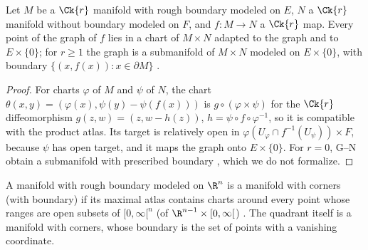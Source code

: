 \begin{proposition}[Graphs]
  \label{prop:rough-graph}
  \leanok
  Let $M$ be a $\Ck{r}$ manifold with rough boundary modeled on $E$, $N$ a $\Ck{r}$ manifold without
  boundary modeled on $F$, and $f \colon M \to N$ a $\Ck{r}$ map. Every point of the graph of $f$
  lies in a chart of $M \times N$ adapted to the graph and to $E \times \{0\}$; for $r \geq 1$ the
  graph is a submanifold of $M \times N$ modeled on $E \times \{0\}$, with boundary
  $\{(x, f(x)) : x \in \partial M\}$ \cite[Proposition 3.5.17, pp.~283--284]{GN26}.
\end{proposition}

\begin{proof}
  \leanok
  For charts $\varphi$ of $M$ and $\psi$ of $N$, the chart
  $\theta(x, y) = (\varphi(x), \psi(y) - \psi(f(x)))$ is $g \circ (\varphi \times \psi)$ for the
  $\Ck{r}$ diffeomorphism $g(z, w) = (z, w - h(z))$, $h = \psi \circ f \circ \varphi^{-1}$, so it is
  compatible with the product atlas. Its target is relatively open in
  $\varphi(U_\varphi \cap f^{-1}(U_\psi)) \times F$, because $\psi$ has open target, and it maps the
  graph onto $E \times \{0\}$. For $r = 0$, G--N obtain a submanifold with prescribed boundary
  \cite[3.5.15]{GN26}, which we do not formalize.
\end{proof}

\begin{definition}
  \label{def:corners}
  \leanok
  A manifold with rough boundary modeled on $\R^n$ is a manifold with corners (with boundary) if
  its maximal atlas contains charts around every point whose ranges are open subsets of
  $[0, \infty[^n$ (of $\R^{n-1} \times [0, \infty[$) \cite[Remark 3.5.10, p.~281]{GN26}. The
  quadrant itself is a manifold with corners, whose boundary is the set of points with a vanishing
  coordinate.
\end{definition}

